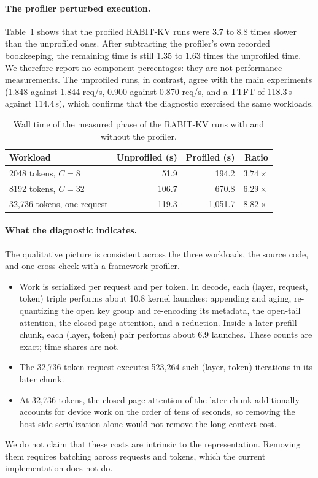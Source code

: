 \documentclass{article}
\begin{document}
\paragraph{The profiler perturbed execution.}
Table~\ref{tab:app-prof} shows that the profiled RABIT-KV runs were 3.7 to 8.8 times slower than the
unprofiled ones. After subtracting the profiler's own recorded bookkeeping, the remaining time is
still 1.35 to 1.63 times the unprofiled time. We therefore report no component percentages: they are
not performance measurements. The unprofiled runs, in contrast, agree with the main experiments
(1.848 against 1.844 req/s, 0.900 against 0.870 req/s, and a TTFT of 118.3\,s against 114.4\,s), which
confirms that the diagnostic exercised the same workloads.

\begin{table}[h]
\centering
\small
\setlength{\tabcolsep}{3.5pt}
\begin{tabular}{@{}lrrr@{}}
\toprule
Workload & Unprofiled (s) & Profiled (s) & Ratio \\
\midrule
2048 tokens, $C{=}8$ & 51.9 & 194.2 & $3.74\times$ \\
8192 tokens, $C{=}32$ & 106.7 & 670.8 & $6.29\times$ \\
32,736 tokens, one request & 119.3 & 1,051.7 & $8.82\times$ \\
\bottomrule
\end{tabular}
\caption{Wall time of the measured phase of the RABIT-KV runs with and without the profiler.}
\label{tab:app-prof}
\end{table}

\paragraph{What the diagnostic indicates.}
The qualitative picture is consistent across the three workloads, the source code, and one
cross-check with a framework profiler.
\begin{itemize}
\item Work is serialized per request and per token. In decode, each (layer, request, token)
  triple performs about 10.8 kernel launches: appending and aging, re-quantizing the open key group
  and re-encoding its metadata, the open-tail attention, the closed-page attention, and a reduction.
  Inside a later prefill chunk, each (layer, token) pair performs about 6.9 launches. These counts are
  exact; time shares are not.
\item The 32,736-token request executes 523,264 such (layer, token) iterations in its later chunk.
\item At 32,736 tokens, the closed-page attention of the later chunk additionally accounts for device
  work on the order of tens of seconds, so removing the host-side serialization alone would not remove
  the long-context cost.
\end{itemize}
We do not claim that these costs are intrinsic to the representation. Removing them requires batching
across requests and tokens, which the current implementation does not do.
\end{document}
